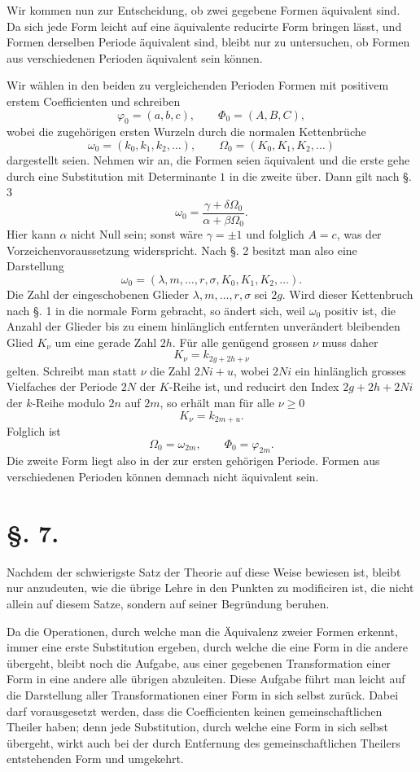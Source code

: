 \documentclass[11pt]{article}
\begin{document}
Wir kommen nun zur Entscheidung, ob zwei gegebene Formen äquivalent sind. Da sich jede Form leicht auf eine äquivalente reducirte Form bringen lässt, und Formen derselben Periode äquivalent sind, bleibt nur zu untersuchen, ob Formen aus verschiedenen Perioden äquivalent sein können.

Wir wählen in den beiden zu vergleichenden Perioden Formen mit positivem erstem Coefficienten und schreiben
\[
 \varphi_0=(a,b,c),
 \qquad
 \Phi_0=(A,B,C),
\]
wobei die zugehörigen ersten Wurzeln durch die normalen Kettenbrüche
\[
 \omega_0=(k_0,k_1,k_2,\ldots),
 \qquad
 \Omega_0=(K_0,K_1,K_2,\ldots)
\]
dargestellt seien. Nehmen wir an, die Formen seien äquivalent und die erste gehe durch eine Substitution mit Determinante $1$ in die zweite über. Dann gilt nach \S. 3
\[
 \omega_0=\frac{\gamma+\delta\Omega_0}{\alpha+\beta\Omega_0}.
\]
Hier kann $\alpha$ nicht Null sein; sonst wäre $\gamma=\pm1$ und folglich $A=c$, was der Vorzeichenvoraussetzung widerspricht. Nach \S. 2 besitzt man also eine Darstellung
\[
 \omega_0=(\lambda,m,\ldots,r,\sigma,
 K_0,K_1,K_2,\ldots).
\]
Die Zahl der eingeschobenen Glieder $\lambda,m,\ldots,r,\sigma$ sei $2g$. Wird dieser Kettenbruch nach \S. 1 in die normale Form gebracht, so ändert sich, weil $\omega_0$ positiv ist, die Anzahl der Glieder bis zu einem hinlänglich entfernten unverändert bleibenden Glied $K_\nu$ um eine gerade Zahl $2h$. Für alle genügend grossen $\nu$ muss daher
\[
 K_\nu=k_{2g+2h+\nu}
\]
gelten. Schreibt man statt $\nu$ die Zahl $2N i+
u$, wobei $2Ni$ ein hinlänglich grosses Vielfaches der Periode $2N$ der $K$-Reihe ist, und reducirt den Index $2g+2h+2Ni$ der $k$-Reihe modulo $2n$ auf $2m$, so erhält man für alle $\nu\geq0$
\[
 K_\nu=k_{2m+
u}.
\]
Folglich ist
\[
 \Omega_0=\omega_{2m},
 \qquad
 \Phi_0=\varphi_{2m}.
\]
Die zweite Form liegt also in der zur ersten gehörigen Periode. Formen aus verschiedenen Perioden können demnach nicht äquivalent sein.

\section*{\S. 7.}

Nachdem der schwierigste Satz der Theorie auf diese Weise bewiesen ist, bleibt nur anzudeuten, wie die übrige Lehre in den Punkten zu modificiren ist, die nicht allein auf diesem Satze, sondern auf seiner Begründung beruhen.

Da die Operationen, durch welche man die Äquivalenz zweier Formen erkennt, immer eine erste Substitution ergeben, durch welche die eine Form in die andere übergeht, bleibt noch die Aufgabe, aus einer gegebenen Transformation einer Form in eine andere alle übrigen abzuleiten. Diese Aufgabe führt man leicht auf die Darstellung aller Transformationen einer Form in sich selbst zurück. Dabei darf vorausgesetzt werden, dass die Coefficienten keinen gemeinschaftlichen Theiler haben; denn jede Substitution, durch welche eine Form in sich selbst übergeht, wirkt auch bei der durch Entfernung des gemeinschaftlichen Theilers entstehenden Form und umgekehrt.
\end{document}
